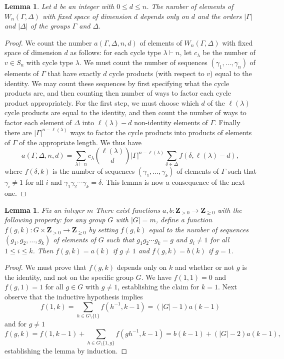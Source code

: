 \documentclass[11pt, reqno]{amsart}
\numberwithin{equation}{section}
\theoremstyle{definition}
\theoremstyle{plain}
\newtheorem{lemma}[theorem]{Lemma}
\newcommand{\ZZ}{\mathbf{Z}}
\begin{document}
\begin{lemma}
Let $d$ be an integer with $0 \leq d \leq n$. The number of elements of $W_n(\Gamma,\Delta)$ with fixed space of dimension $d$ depends only on $d$ and the orders $|\Gamma|$ and $|\Delta|$ of the groups $\Gamma$ and $\Delta$.
\end{lemma}
\begin{proof}
We count the number $a(\Gamma,\Delta,n,d)$ of elements of $W_n(\Gamma,\Delta)$ with fixed space of dimension $d$ as follows: for each cycle type $\lambda \vdash n$, let $c_\lambda$ be the number of $v \in S_n$ with cycle type $\lambda$. We must count the number of sequences $(\gamma_1,\dots,\gamma_n)$ of elements of $\Gamma$ that have exactly $d$ cycle products (with respect to $v$) equal to the identity. We may count these sequences by first specifying what the cycle products are, and then counting then number of ways to factor each cycle product appropriately. For the first step, we must choose which $d$ of the $\ell(\lambda)$ cycle products are equal to the identity, and then count the number of ways to factor each element of $\Delta$ into $\ell(\lambda)-d$ non-identity elements of $\Gamma$. Finally there are $|\Gamma|^{n-\ell(\lambda)}$ ways to factor the cycle products into products of elements of $\Gamma$ of the appropriate length. We thus have
$$a(\Gamma,\Delta,n,d)=\sum_{\lambda \vdash n} c_\lambda {\ell(\lambda)\choose d} |\Gamma|^{n-\ell(\lambda)} \sum_{\delta \in \Delta} f(\delta,\ell(\lambda)-d), $$ where $f(\delta,k)$ is the number of sequences $(\gamma_1,\dots,\gamma_k)$ of elements of $\Gamma$ such that $\gamma_i \neq 1$ for all $i$ and $\gamma_1 \gamma_2 \cdots \gamma_k=\delta$. This lemma is now a consequence of the next one.
\end{proof}

\begin{lemma}
Fix an integer $m$ There exist functions $a,b: \ZZ_{>0} \to \ZZ_{\geq 0}$ with the following property: for any group $G$ with $|G|=m$, define a function $f(g,k): G \times \ZZ_{>0} \to \ZZ_{ \geq 0}$ by setting $f(g,k)$ equal to the number of sequences $(g_1,g_2,\dots,g_k)$ of elements of $G$ such that $g_1 g_2 \cdots g_k=g$ and $g_i \neq 1$ for all $1 \leq i \leq k$.  Then $f(g,k)=a(k)$ if $g \neq 1$ and $f(g,k)=b(k)$ if $g=1$.
\end{lemma}
\begin{proof}
We must prove that $f(g,k)$ depends only on $k$ and whether or not $g$ is the identity, and not on the specific group $G$. We have $f(1,1)=0$ and $f(g,1)=1$ for all $g \in G$ with $g \neq 1$, establishing the claim for $k=1$. Next observe that the inductive hypothesis implies $$f(1,k)=\sum_{h \in G \setminus \{1 \}} f(h^{-1},k-1)=(|G|-1) a(k-1)$$ and for $g \neq 1$
$$f(g,k)=f(1,k-1)+\sum_{h \in G \setminus \{1,g \}} f(gh^{-1},k-1)=b(k-1)+(|G|-2) a(k-1),$$ establishing the lemma by induction.
\end{proof}
\end{document}
